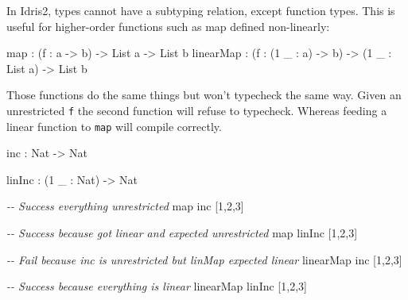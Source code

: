 \documentclass[
]{article}
\newenvironment{Shaded}{}{}
\newcommand{\CommentTok}[1]{\textcolor[rgb]{0.38,0.63,0.69}{\textit{#1}}}
\newcommand{\DataTypeTok}[1]{\textcolor[rgb]{0.56,0.13,0.00}{#1}}
\newcommand{\DecValTok}[1]{\textcolor[rgb]{0.25,0.63,0.44}{#1}}
\newcommand{\FunctionTok}[1]{\textcolor[rgb]{0.02,0.16,0.49}{#1}}
\newcommand{\NormalTok}[1]{#1}
\newcommand{\OperatorTok}[1]{\textcolor[rgb]{0.40,0.40,0.40}{#1}}
\newcommand{\OtherTok}[1]{\textcolor[rgb]{0.00,0.44,0.13}{#1}}
\begin{document}
In Idris2, types cannot have a subtyping relation, except function
types. This is useful for higher-order functions such as map defined
non-linearly:

\begin{Shaded}
\begin{Highlighting}[]
\FunctionTok{map} \OperatorTok{:}\NormalTok{ (f }\OperatorTok{:}\NormalTok{ a }\OtherTok{{-}\textgreater{}}\NormalTok{ b) }\OtherTok{{-}\textgreater{}} \DataTypeTok{List}\NormalTok{ a }\OtherTok{{-}\textgreater{}} \DataTypeTok{List}\NormalTok{ b}
\NormalTok{linearMap }\OperatorTok{:}\NormalTok{ (f }\OperatorTok{:}\NormalTok{ (}\DecValTok{1}\NormalTok{ \_ }\OperatorTok{:}\NormalTok{ a) }\OtherTok{{-}\textgreater{}}\NormalTok{ b) }\OtherTok{{-}\textgreater{}}\NormalTok{ (}\DecValTok{1}\NormalTok{ \_ }\OperatorTok{:} \DataTypeTok{List}\NormalTok{ a) }\OtherTok{{-}\textgreater{}} \DataTypeTok{List}\NormalTok{ b}
\end{Highlighting}
\end{Shaded}

Those functions do the same things but won't typecheck the same way.
Given an unrestricted \texttt{f} the second function will refuse to
typecheck. Whereas feeding a linear function to \texttt{map} will
compile correctly.

\begin{Shaded}
\begin{Highlighting}[]
\NormalTok{inc }\OperatorTok{:} \DataTypeTok{Nat} \OtherTok{{-}\textgreater{}} \DataTypeTok{Nat}

\NormalTok{linInc }\OperatorTok{:}\NormalTok{ (}\DecValTok{1}\NormalTok{ \_ }\OperatorTok{:} \DataTypeTok{Nat}\NormalTok{) }\OtherTok{{-}\textgreater{}} \DataTypeTok{Nat}

\CommentTok{{-}{-} Success everything unrestricted}
\FunctionTok{map}\NormalTok{ inc [}\DecValTok{1}\NormalTok{,}\DecValTok{2}\NormalTok{,}\DecValTok{3}\NormalTok{] }

\CommentTok{{-}{-} Success because got linear and expected unrestricted}
\FunctionTok{map}\NormalTok{ linInc [}\DecValTok{1}\NormalTok{,}\DecValTok{2}\NormalTok{,}\DecValTok{3}\NormalTok{]}

\CommentTok{{-}{-} Fail because inc is unrestricted but linMap expected linear}
\NormalTok{linearMap inc [}\DecValTok{1}\NormalTok{,}\DecValTok{2}\NormalTok{,}\DecValTok{3}\NormalTok{]}

\CommentTok{{-}{-} Success because everything is linear}
\NormalTok{linearMap linInc [}\DecValTok{1}\NormalTok{,}\DecValTok{2}\NormalTok{,}\DecValTok{3}\NormalTok{]}
\end{Highlighting}
\end{Shaded}
\end{document}
